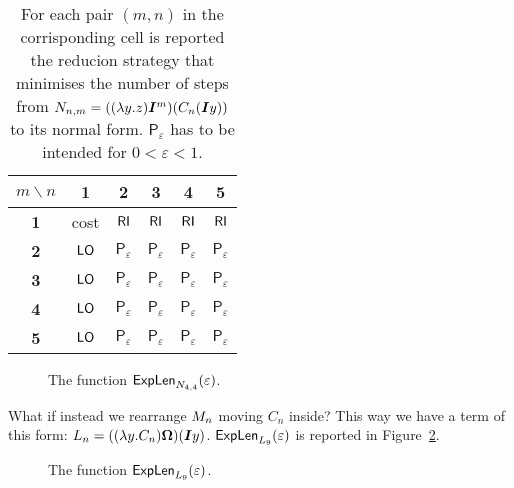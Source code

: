 \begin{table}
	\centering
\begin{tabular}{|c|c|c|c|c|c|}
	\hline 
	$m\backslash n$ & \textbf{1} & \textbf{2} & \textbf{3} & \textbf{4} & \textbf{5}\tabularnewline
	\hline 
	\textbf{1} &cost  &$\textsf{RI}$  &$\textsf{RI}$  &$\textsf{RI}$  &$\textsf{RI}$ \tabularnewline
	\hline 
	\textbf{2} &$\textsf{LO}$  &$\mathsf{P}_\varepsilon$  &$\mathsf{P}_\varepsilon$  &$\mathsf{P}_\varepsilon$  &$\mathsf{P}_\varepsilon$ \tabularnewline
	\hline 
	\textbf{3} &$\textsf{LO}$  &$\mathsf{P}_\varepsilon$  &$\mathsf{P}_\varepsilon$  &$\mathsf{P}_\varepsilon$  &$\mathsf{P}_\varepsilon$ \tabularnewline
	\hline 
	\textbf{4} &$\textsf{LO}$  &$\mathsf{P}_\varepsilon$  &$\mathsf{P}_\varepsilon$  &$\mathsf{P}_\varepsilon$  &$\mathsf{P}_\varepsilon$ \tabularnewline
	\hline 
	\textbf{5} &$\textsf{LO}$  &$\mathsf{P}_\varepsilon$  &$\mathsf{P}_\varepsilon$  &$\mathsf{P}_\varepsilon$  &$\mathsf{P}_\varepsilon$ \tabularnewline
	\hline 
\end{tabular}
\caption[Optimal strategies for $\termtwo_{n,m}=((\lambda y.z)\bm{I}^m) (C_n(\bm{I}y))$]{For each pair $(m,n)$ in the corrisponding cell is reported the reducion strategy that minimises the number of steps from $\termtwo_{n,m}=((\lambda y.z)\bm{I}^m) (C_n(\bm{I}y))$ to its normal form. $\mathsf{P}_\varepsilon$ has to be intended for $0<\varepsilon<1$.}
\label{table:optimal}
\end{table}
\begin{figure}
		\caption{The function $\textsf{ExpLen}_{N_{4,4}}(\varepsilon)$.}
		\label{figure:strnor}
	\end{figure}
What if instead we rearrange $M_n$ moving $C_n$ inside? This way we have a term of this form: $L_n=((\lambda y.C_n)\bm{\Omega})(\bm{I}y)$. $\textsf{ExpLen}_{L_9}(\varepsilon)$ is reported in Figure~\ref{figure:plot2}.
\begin{figure}
		\caption{The function $\textsf{ExpLen}_{L_9}(\varepsilon)$.}
		\label{figure:plot2}
	\end{figure}
